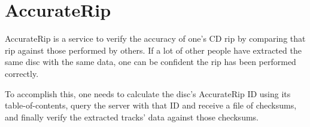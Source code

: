 
\chapter{AccurateRip}
AccurateRip is a service to verify the accuracy of one's CD rip
by comparing that rip against those performed by others.
If a lot of other people have extracted the same disc with the same data,
one can be confident the rip has been performed correctly.

To accomplish this, one needs to calculate the disc's
AccurateRip ID using its table-of-contents,
query the server with that ID and receive a file of checksums,
and finally verify the extracted tracks' data against those checksums.

\clearpage


